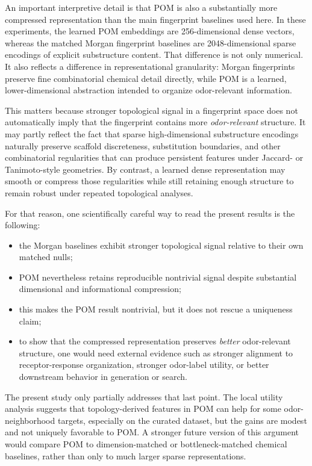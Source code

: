 \documentclass[11pt]{article}
\begin{document}
An important interpretive detail is that POM is also a substantially more compressed representation than the main fingerprint baselines used here. In these experiments, the learned POM embeddings are 256-dimensional dense vectors, whereas the matched Morgan fingerprint baselines are 2048-dimensional sparse encodings of explicit substructure content. That difference is not only numerical. It also reflects a difference in representational granularity: Morgan fingerprints preserve fine combinatorial chemical detail directly, while POM is a learned, lower-dimensional abstraction intended to organize odor-relevant information.

This matters because stronger topological signal in a fingerprint space does not automatically imply that the fingerprint contains more \emph{odor-relevant} structure. It may partly reflect the fact that sparse high-dimensional substructure encodings naturally preserve scaffold discreteness, substitution boundaries, and other combinatorial regularities that can produce persistent features under Jaccard- or Tanimoto-style geometries. By contrast, a learned dense representation may smooth or compress those regularities while still retaining enough structure to remain robust under repeated topological analyses.

For that reason, one scientifically careful way to read the present results is the following:

\begin{itemize}
  \item the Morgan baselines exhibit stronger topological signal relative to their own matched nulls;
  \item POM nevertheless retains reproducible nontrivial signal despite substantial dimensional and informational compression;
  \item this makes the POM result nontrivial, but it does not rescue a uniqueness claim;
  \item to show that the compressed representation preserves \emph{better} odor-relevant structure, one would need external evidence such as stronger alignment to receptor-response organization, stronger odor-label utility, or better downstream behavior in generation or search.
\end{itemize}

The present study only partially addresses that last point. The local utility analysis suggests that topology-derived features in POM can help for some odor-neighborhood targets, especially on the curated dataset, but the gains are modest and not uniquely favorable to POM. A stronger future version of this argument would compare POM to dimension-matched or bottleneck-matched chemical baselines, rather than only to much larger sparse representations.
\end{document}

